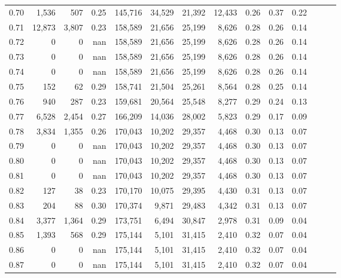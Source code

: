 \begin{tabular}{rrrrrrrrrrrrrr}
0.70 &   1,536 &    507 &  0.25 &  145,716 &   34,529 &  21,392 &  12,433 &  0.26 &  0.37 &      0.22 \\
0.71 &  12,873 &  3,807 &  0.23 &  158,589 &   21,656 &  25,199 &   8,626 &  0.28 &  0.26 &      0.14 \\
0.72 &       0 &      0 &   nan &  158,589 &   21,656 &  25,199 &   8,626 &  0.28 &  0.26 &      0.14 \\
0.73 &       0 &      0 &   nan &  158,589 &   21,656 &  25,199 &   8,626 &  0.28 &  0.26 &      0.14 \\
0.74 &       0 &      0 &   nan &  158,589 &   21,656 &  25,199 &   8,626 &  0.28 &  0.26 &      0.14 \\
0.75 &     152 &     62 &  0.29 &  158,741 &   21,504 &  25,261 &   8,564 &  0.28 &  0.25 &      0.14 \\
0.76 &     940 &    287 &  0.23 &  159,681 &   20,564 &  25,548 &   8,277 &  0.29 &  0.24 &      0.13 \\
0.77 &   6,528 &  2,454 &  0.27 &  166,209 &   14,036 &  28,002 &   5,823 &  0.29 &  0.17 &      0.09 \\
0.78 &   3,834 &  1,355 &  0.26 &  170,043 &   10,202 &  29,357 &   4,468 &  0.30 &  0.13 &      0.07 \\
0.79 &       0 &      0 &   nan &  170,043 &   10,202 &  29,357 &   4,468 &  0.30 &  0.13 &      0.07 \\
0.80 &       0 &      0 &   nan &  170,043 &   10,202 &  29,357 &   4,468 &  0.30 &  0.13 &      0.07 \\
0.81 &       0 &      0 &   nan &  170,043 &   10,202 &  29,357 &   4,468 &  0.30 &  0.13 &      0.07 \\
0.82 &     127 &     38 &  0.23 &  170,170 &   10,075 &  29,395 &   4,430 &  0.31 &  0.13 &      0.07 \\
0.83 &     204 &     88 &  0.30 &  170,374 &    9,871 &  29,483 &   4,342 &  0.31 &  0.13 &      0.07 \\
0.84 &   3,377 &  1,364 &  0.29 &  173,751 &    6,494 &  30,847 &   2,978 &  0.31 &  0.09 &      0.04 \\
0.85 &   1,393 &    568 &  0.29 &  175,144 &    5,101 &  31,415 &   2,410 &  0.32 &  0.07 &      0.04 \\
0.86 &       0 &      0 &   nan &  175,144 &    5,101 &  31,415 &   2,410 &  0.32 &  0.07 &      0.04 \\
0.87 &       0 &      0 &   nan &  175,144 &    5,101 &  31,415 &   2,410 &  0.32 &  0.07 &      0.04 \\

\end{tabular}
